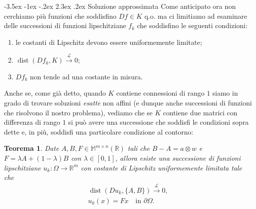 \documentclass[a4paper,11pt]{book}
\makeatletter
\theoremstyle{plain}
\newtheorem{teo}{Teorema}[chapter]
\theoremstyle{definition}
\theoremstyle{remark}
\newcommand{\R}{\mathbb{R}}
\newcommand{\M}{\mathbb{M}}
\newcommand{\LL}{\mathscr{L}}
\DeclareMathOperator{\dist}{dist}
\renewcommand\section{\@startsection {section}{1}{\z@}%
                                   {-3.5ex \@plus -1ex \@minus -.2ex}%
                                   {2.3ex \@plus.2ex}%
                                   {\normalfont\Large\bfseries}}
\makeatother
\begin{document}
\section{Soluzione approssimata}
Come anticipato ora non cerchiamo più funzioni che soddisfino $Df\in K$ q.o. ma ci limitiamo ad esaminare delle successioni di funzioni lipschitziane $f_k$ che soddisfino le seguenti condizioni:
\begin{enumerate}
	\item le costanti di Lipschitz devono essere uniformemente limitate;
	\item$\dist(Df_k,K)\xrightarrow{\LL}0$;
	\item $Df_{k}$ non tende ad una costante in misura.
\end{enumerate}

Anche se, come già detto, quando $K$ contiene connessioni di rango $1$ siamo in grado di trovare soluzioni \textit{esatte} non affini (e dunque anche successioni di funzioni che risolvono il nostro problema), vediamo che se $K$ contiene due matrici con differenza di rango $1$ si può avere una successione che soddisfi le condizioni sopra dette e, in più, soddisfi una particolare condizione al contorno:
\begin{teo}\label{teo:4}
	Date $A,B,F\in \M^{m\times n}(\R)$ tali che $B-A=a\otimes w$ e $F=\lambda A+(1-\lambda)B$ con $\lambda\in[0,1]$, allora esiste una successione di funzioni lipschitziane $u_k:\Omega\to\R^{m}$ con costante di Lipschitz uniformemente limitata tale che
	\begin{gather*}
		\dist(Du_k,\{A,B\})\xrightarrow{\LL} 0,\\
		u_k(x) = Fx \quad\text{in }\partial \Omega.
	\end{gather*}
\end{teo}
\end{document}
